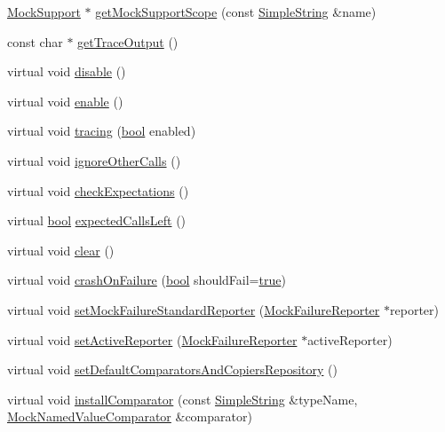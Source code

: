 \begin{DoxyCompactItemize}
\item 
\hyperlink{class_mock_support}{Mock\+Support} $\ast$ \hyperlink{class_mock_support_aba4ec397373a176c470264b0689a983f}{get\+Mock\+Support\+Scope} (const \hyperlink{class_simple_string}{Simple\+String} \&name)
\item 
const char $\ast$ \hyperlink{class_mock_support_a41afc07dfa2704555664ed1796bebdba}{get\+Trace\+Output} ()
\item 
virtual void \hyperlink{class_mock_support_a8cfbbe53c1cf6e3054736daea3044c0f}{disable} ()
\item 
virtual void \hyperlink{class_mock_support_a486f22824bd83c5308a0d70ffac6f758}{enable} ()
\item 
virtual void \hyperlink{class_mock_support_a4414204b62274c260f6507e97da7fb5e}{tracing} (\hyperlink{avb__gptp_8h_af6a258d8f3ee5206d682d799316314b1}{bool} enabled)
\item 
virtual void \hyperlink{class_mock_support_ae5bfa35a3e8a4328360a1b824bfa10c6}{ignore\+Other\+Calls} ()
\item 
virtual void \hyperlink{class_mock_support_aaf94db2d926ab0a1cae9fc65c7eec54c}{check\+Expectations} ()
\item 
virtual \hyperlink{avb__gptp_8h_af6a258d8f3ee5206d682d799316314b1}{bool} \hyperlink{class_mock_support_a3c92e50fa7fae84cbf827632ba5d7e11}{expected\+Calls\+Left} ()
\item 
virtual void \hyperlink{class_mock_support_ac8bb3912a3ce86b15842e79d0b421204}{clear} ()
\item 
virtual void \hyperlink{class_mock_support_a4fa2d8529de4baf5fcf260ea3f088ae4}{crash\+On\+Failure} (\hyperlink{avb__gptp_8h_af6a258d8f3ee5206d682d799316314b1}{bool} should\+Fail=\hyperlink{avb__gptp_8h_af6a258d8f3ee5206d682d799316314b1a08f175a5505a10b9ed657defeb050e4b}{true})
\item 
virtual void \hyperlink{class_mock_support_a05cf05670025073bd4011757b7cdc078}{set\+Mock\+Failure\+Standard\+Reporter} (\hyperlink{class_mock_failure_reporter}{Mock\+Failure\+Reporter} $\ast$reporter)
\item 
virtual void \hyperlink{class_mock_support_a5b30c782d3cc89d851f6ca446e3bcfbf}{set\+Active\+Reporter} (\hyperlink{class_mock_failure_reporter}{Mock\+Failure\+Reporter} $\ast$active\+Reporter)
\item 
virtual void \hyperlink{class_mock_support_acab831c1aaad4786986f38b760c5c7dc}{set\+Default\+Comparators\+And\+Copiers\+Repository} ()
\item 
virtual void \hyperlink{class_mock_support_a724ca1b858b51a67b3dc2bd8e77ff4a3}{install\+Comparator} (const \hyperlink{class_simple_string}{Simple\+String} \&type\+Name, \hyperlink{class_mock_named_value_comparator}{Mock\+Named\+Value\+Comparator} \&comparator)

\end{DoxyCompactItemize}
